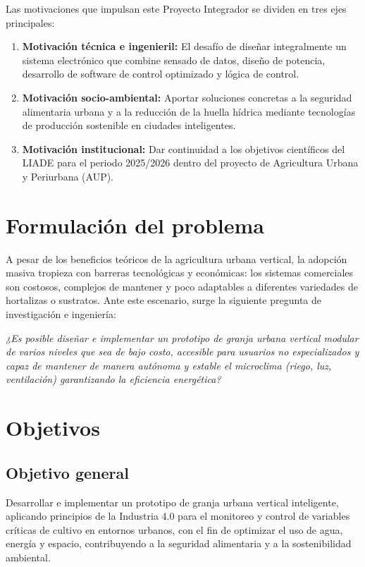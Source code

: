 Las motivaciones que impulsan este Proyecto Integrador se dividen en tres ejes principales:
\begin{enumerate}
    \item \textbf{Motivación técnica e ingenieril:} El desafío de diseñar integralmente un sistema electrónico que combine sensado de datos, diseño de potencia, desarrollo de software de control optimizado y lógica de control.
    \item \textbf{Motivación socio-ambiental:} Aportar soluciones concretas a la seguridad alimentaria urbana y a la reducción de la huella hídrica mediante tecnologías de producción sostenible en ciudades inteligentes.
    \item \textbf{Motivación institucional:} Dar continuidad a los objetivos científicos del LIADE para el periodo 2025/2026 dentro del proyecto de Agricultura Urbana y Periurbana (AUP).
\end{enumerate}

\section{Formulación del problema}
\label{sec:formulacion_problema}

A pesar de los beneficios teóricos de la agricultura urbana vertical, la adopción masiva tropieza con barreras tecnológicas y económicas: los sistemas comerciales son costosos, complejos de mantener y poco adaptables a diferentes variedades de hortalizas o sustratos. Ante este escenario, surge la siguiente pregunta de investigación e ingeniería:

\textit{¿Es posible diseñar e implementar un prototipo de granja urbana vertical modular de varios niveles que sea de bajo costo, accesible para usuarios no especializados y capaz de mantener de manera autónoma y estable el microclima (riego, luz, ventilación) garantizando la eficiencia energética?}

\section{Objetivos}
\label{sec:objetivos}

\subsection{Objetivo general}
Desarrollar e implementar un prototipo de granja urbana vertical inteligente, aplicando principios de la Industria 4.0 para el monitoreo y control de variables críticas de cultivo en entornos urbanos, con el fin de optimizar el uso de agua, energía y espacio, contribuyendo a la seguridad alimentaria y a la sostenibilidad ambiental.


